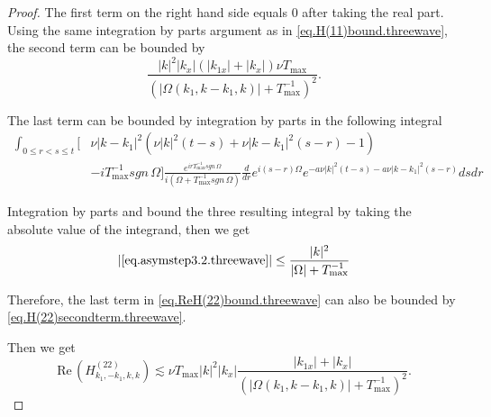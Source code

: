 \begin{proof}
The first term on the right hand side equals $0$ after taking the real part. Using the same integration by parts argument as in \eqref{eq.H(11)bound.threewave}, the second term can be bounded by 
\begin{equation}\label{eq.H(22)secondterm.threewave}
    \frac{|k|^2|k_x|(|k_{1x}|+|k_x|)\nu T_{\text{max}}}{(|\Omega(k_1,k-k_1,k)|+T^{-1}_{\text{max}})^2}.
\end{equation}

The last term can be bounded by integration by parts in the following integral
\begin{equation}\label{eq.asymstep3.2.threewave}
\begin{split}
    \int_{0\le r<s\le t}\big[&\nu|k-k_1|^2(\nu|k|^2(t-s)+\nu|k-k_1|^2(s-r)-1)
    \\
    & -iT^{-1}_{\text{max}}sgn\, \Omega\big]\frac{e^{irT^{-1}_{\text{max}}sgn\, \Omega}}{i(\Omega+T^{-1}_{\text{max}}sgn\, \Omega)}\frac{d}{dr}e^{i (s-r)\Omega}e^{- a\nu|k|^2(t-s)-a\nu|k-k_1|^2(s-r)}  dsdr
\end{split}
\end{equation}

Integration by parts and bound the three resulting integral by taking the absolute value of the integrand, then we get 
\begin{equation}
|\eqref{eq.asymstep3.2.threewave}|\le  \frac{|k|^2}{|\Omega|+T^{-1}_{\text{max}}}
\end{equation}

Therefore, the last term in \eqref{eq.ReH(22)bound.threewave} can also be bounded by \eqref{eq.H(22)secondterm.threewave}.

Then we get 
\begin{equation}
    \text{Re}\,\left(H^{(22)}_{k_1,-k_1,k,k}\right)\lesssim \nu T_{\text{max}}|k|^2|k_x|\frac{|k_{1x}|+|k_x|}{(|\Omega(k_1,k-k_1,k)|+T^{-1}_{\text{max}})^2}.
\end{equation}


\end{proof}
